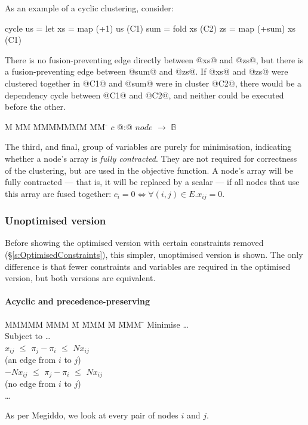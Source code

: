 As an example of a cyclic clustering, consider:
\begin{code}
cycle us
 = let xs  = map (+1) us          (C1)
       sum = fold xs              (C2)
       zs  = map (+sum) xs        (C1)
\end{code}
There is no fusion-preventing edge directly between @xs@ and @zs@, but there is a fusion-preventing edge between @sum@ and @zs@.
If @xs@ and @zs@ were clustered together in @C1@ and @sum@ were in cluster @C2@, there would be a dependency cycle between @C1@ and @C2@, and neither could be executed before the other.

\begin{tabbing}
M   \= MM \= MMMMMMM \= MM \= \kill
$c$   \> @:@  \> $node$             \> $\to$ \> $\mathbb{B}$
\end{tabbing}
The third, and final, group of variables are purely for minimisation, indicating whether a node's array is \emph{fully contracted}.
They are not required for correctness of the clustering, but are used in the objective function.
A node's array will be fully contracted --- that is, it will be replaced by a scalar --- if all nodes that use this array are fused together: $c_i = 0 \iff \forall (i,j) \in E. x_{ij} = 0$. 


\subsubsection{Unoptimised version}
Before showing the optimised version with certain constraints removed (\S\ref{s:OptimisedConstraints}), this simpler, unoptimised version is shown. The only difference is that fewer constraints and variables are required in the optimised version, but both versions are equivalent.   


\paragraph{Acyclic and precedence-preserving}

\begin{tabbing}
MMMMM   \= MMM \= M \= MMM \= M \= MMM \= \kill
Minimise   \> \ldots \\
Subject to \> \ldots \\
           \>    $x_{ij}$ \> $\le$ \> $\pi_j - \pi_i$ \> $\le$ \> $N x_{ij}$ \\
           \>             (an edge from $i$ to $j$)            \\
           \> $-N x_{ij}$ \> $\le$ \> $\pi_j - \pi_i$ \> $\le$ \> $N x_{ij}$ \\
           \>             (no edge from $i$ to $j$)            \\
           \> \ldots
\end{tabbing}
As per Megiddo\cite{megiddo1998optimal}, we look at every pair of nodes $i$ and $j$.

